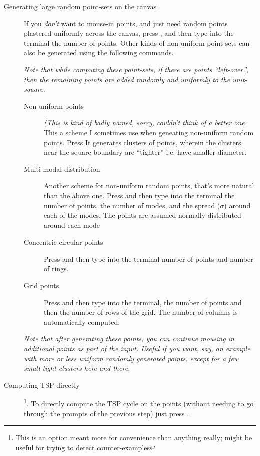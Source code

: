 \begin{appendices}
\begin{description}
\item[Generating large random point-sets on the canvas] If you \textit{don't} want to mouse-in points, and just need random points plastered uniformly across the canvas, 
press , and then type into the terminal the number of points. Other kinds of non-uniform point sets can also be generated using the following 
     commands. 

     \begin{mdframed}
     \textit{Note that while computing these point-sets, if there are points ``left-over'', then the remaining points are added randomly and uniformly to the unit-square. }
     \end{mdframed}

     \begin{description}
         \item[Non uniform points] \textit{(This is kind of badly named, sorry, couldn't think of a better one \smiley} This a scheme I sometimes use when geneating non-uniform random points. Press  It generates clusters of points, wherein the clusters near the square boundary are ``tighter'' i.e. have smaller diameter.
         \item[Multi-modal distribution] Another scheme for non-uniform random points, that's more natural than the above one.  Press  and then type into the terminal the number of points, the number of modes, and the spread ($\sigma$)
              around each of the modes. The points are assumed normally distributed around each mode
         \item[Concentric circular points] Press  and then type into the terminal number of points and number of rings. 
         \item[Grid points] Press  and then type into the terminal, the number of points and then the number of rows of the grid. The number of columns
          is automatically computed. 
     \end{description}

\begin{mdframed}
  \textit{Note that after generating these points, you can continue mousing in additional points as part of the input. Useful 
  if you want, say, an example with more or less uniform randomly generated points, except for a few small tight clusters here and there. }
\end{mdframed}

\item[Computing TSP directly] \footnote{This is an option meant more for convenience than anything really; might be useful for trying to detect counter-examples}.   
To directly compute the TSP cycle on the points (without needing to go through the prompts of the previous step) just press . 


\end{description}
\end{appendices}

